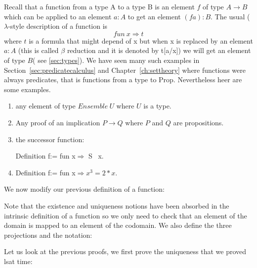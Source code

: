   Recall that a function from a type A to a type B is an element $f$ of type $A\rightarrow B$ which can be applied to an element $a:A$ to get an element $(f a):B$. The usual ($\lambda$-style description of a function is $$fun \ x \Rightarrow t$$ where $t$ is a formula that might depend of x but when x is replaced by an element $a:A$  (this is called $\beta$ reduction and it is  denoted by t[a/x]) we will get an element of type $B$( see \ref{sec:types}). We have seen many such examples in Section~\ref{sec:predicatecalculus} and  Chapter~\ref{ch:settheory}  where functions were always predicates, that is functions from a type to Prop. Nevertheless heer are some  examples.
  
  \begin{example}	
  	\begin{enumerate}\item any element of type $Ensemble\  U$ where $U$ is a type.
  		\item Any proof of an implication $P \rightarrow Q$ where $P$ and $Q$ are propositions.
  		

  		\item the successor function:
  		
  		{Definition f:= fun x$\Rightarrow$ S \ x.}
  		\item {Definition f:= fun x$\Rightarrow x^3=2*x$.}
  		  	\end{enumerate}   	
  \end{example}
  
  We now modify our previous definition of a function:


Note that the existence and uniqueness notions have been absorbed in the intrinsic definition of a function so we only need to check that an element of the domain is mapped to an element of the codomain. We also define the three projections and the notation:

Let us look at the previous proofs, we first prove the uniqueness that we proved lsat time:

